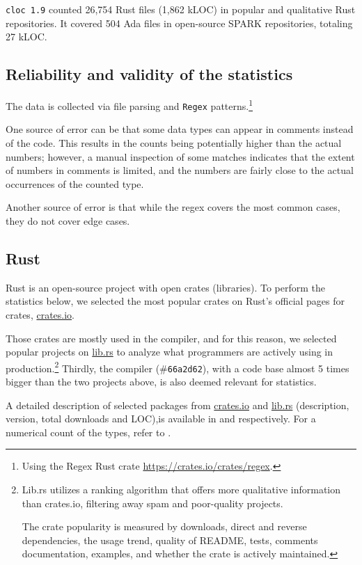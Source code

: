 \documentclass[nomenclature, english, bibtex]{kththesis}
\begin{document}
\texttt{cloc 1.9} counted 26,754 Rust files (1,862 k\gls{LOC}) in popular and qualitative Rust repositories. It covered 504 Ada files in open-source SPARK repositories, totaling 27 kLOC.

\subsection{Reliability and validity of the statistics}

The data is collected via file parsing and \texttt{Regex} patterns.\footnote{Using the Regex Rust crate \href{(documentation)}{https://crates.io/crates/regex}.} 

One source of error can be that some data types can appear in comments instead of the code. This results in the counts being potentially higher than the actual numbers; however, a manual inspection of some matches indicates that the extent of numbers in comments is limited, and the numbers are fairly close to the actual occurrences of the counted type.

Another source of error is that while the regex covers the most common cases, they do not cover edge cases.

\subsection{Rust}

Rust is an open-source project with open crates (libraries). To perform the statistics below, we selected the most popular crates on Rust's official pages for crates, \href{https://crates.io/}{crates.io}. 

Those crates are mostly used in the compiler, and for this reason, we selected popular projects on \href{https://lib.rs}{lib.rs} to analyze what programmers are actively using in production.\footnote{Lib.rs utilizes a ranking algorithm that offers more qualitative information than crates.io, filtering away spam and poor-quality projects. 

The crate popularity is measured by downloads, direct and reverse dependencies, the usage trend, quality of README, tests, comments documentation, examples, and whether the crate is actively maintained.}
Thirdly, the compiler (\#\texttt{66a2d62}), with a code base almost 5 times bigger than the two projects above, is also deemed relevant for statistics.

A detailed description of selected packages from \href{https://lib.rs/}{crates.io} and \href{https://lib.rs/}{lib.rs} (description, version, total downloads and \gls{LOC}),is available in  and  respectively. For a numerical count of the types, refer to .
\end{document}
